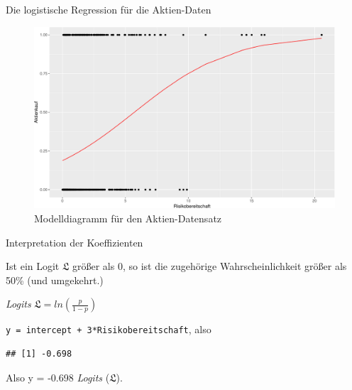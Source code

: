 \begin{frame}{Die logistische Regression für die Aktien-Daten}

\begin{figure}

{\centering \includegraphics[width=0.8\linewidth]{PraDa_Folien_nm_2_files/figure-beamer/aktien-plot-1} 

}

\caption{Modelldiagramm für den Aktien-Datensatz}\label{fig:aktien-plot}
\end{figure}

\end{frame}

\begin{frame}[fragile]{Interpretation der Koeffizienten}

Ist ein Logit \(\mathfrak{L}\) größer als \(0\), so ist die zugehörige
Wahrscheinlichkeit größer als 50\% (und umgekehrt.)

\emph{Logits}
\(\mathfrak{L} = ln\left( \frac{p}{1-p} \right)\)

\texttt{y\ =\ intercept\ +\ 3*Risikobereitschaft}, also

\begin{Shaded}
\begin{Highlighting}[]
\StringTok{ }\OperatorTok{-} \OperatorTok{+}\StringTok{ } \OperatorTok{*}\StringTok{ }\NormalTok{)}
\end{Highlighting}
\end{Shaded}

\begin{verbatim}
## [1] -0.698
\end{verbatim}

Also y = -0.698 \emph{Logits} (\(\mathfrak{L}\)).

\end{frame}

